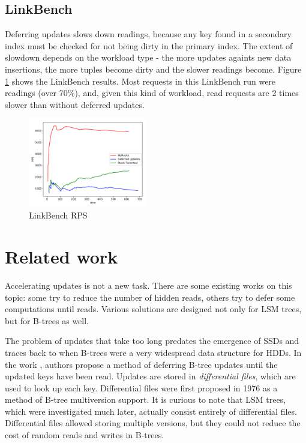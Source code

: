\documentclass{vldb}
\begin{document}
\subsection{LinkBench}

Deferring updates slows down readings, because any key found in a secondary
index must be checked for not being dirty in the primary index. The extent of slowdown
depends on the workload type - the more updates againts new data insertions, the more
tuples become dirty and the slower readings become. Figure \ref{fig:linkbench}
shows the LinkBench \cite{Armstrong:linkbench} results. Most requests in this
LinkBench run were readings (over 70\%), and, given this kind of workload, read
requests are 2 times slower than without deferred updates.

\begin{figure}
\centering
\includegraphics[width=0.46\textwidth]{linkbench}
\caption{LinkBench RPS}
\label{fig:linkbench}
\end{figure}

\section{Related work}
Accelerating updates is not a new task. There are some existing works
on this topic: some try to reduce the number of hidden reads, others try to
defer some computations until reads. Various solutions are designed not only for
LSM trees, but for B-trees as well.

The problem of updates that take too long predates the emergence of SSDs
and traces back to when B-trees were a very widespread data structure for
HDDs. In the work \cite{Edward:incremental_update}, authors propose a
method of deferring B-tree updates until the updated keys have been read.
Updates are stored in \textit{differential files}, which are used to look up
each key. Differential files were first proposed in 1976 \cite{Lohman:differential_files}
as a method of B-tree multiversion support. It is curious to note that LSM trees,
which were investigated much later, actually consist entirely of differential files.
Differential files allowed storing multiple versions, but they could not reduce
the cost of random reads and writes in B-trees.
\end{document}
